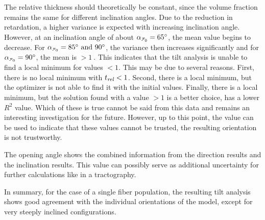 \par
%
The relative thickness \trel{} should theoretically be constant, since the volume fraction remains the same for different inclination angles.
Due to the reduction in retardation, a higher variance is expected with increasing inclination angle.
However, at an inclination angle of about $\modelInc=\SI{65}{\degree}$, the mean value begins to decrease.
For $\modelInc=\SIlist{85;90}{\degree}$, the variance then increases significantly and for $\modelInc=\SI{90}{\degree}$, the mean is $>\SI{1}{}$.
This indicates that the tilt analysis is unable to find a local minimum for \trel{} values $<1$.
This may be due to several reasons.
First, there is no local minimum with $\textnormal{$t_\mathit{rel}$}<1$.
Second, there is a local minimum, but the optimizer is not able to find it with the initial values.
Finally, there is a local minimum, but the solution found with a \trel{} value $>1$ is a better choice, \ie{} has a lower $R^2$ value.
Which of these is true cannot be said from this data and remains an interesting investigation for the future.
However, up to this point, the \trel{} value can be used to indicate that these values cannot be trusted, \ie{} the resulting orientation is not trustworthy.
\par
%
The opening angle shows the combined information from the direction results and the inclination results.
This value can possibly serve as additional uncertainty for further calculations like in a tractography.
\par
%
In summary, for the case of a single fiber population, the resulting tilt analysis shows good agreement with the individual orientations of the model, except for very steeply inclined configurations.
%
% 
% 
